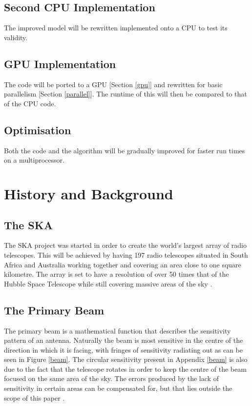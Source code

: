 \subsection{Second CPU Implementation}
The improved model will be rewritten implemented onto a CPU to test its validity.
\subsection{GPU Implementation}
The code will be ported to a GPU [Section \ref{gpu}] and rewritten for basic parallelism [Section \ref{parallel}]. The runtime of this will then be compared to that of the CPU code.
\subsection{Optimisation}
Both the code and the algorithm will be gradually improved for faster run times on a multiprocessor.
\newpage
\section{History and Background}
\subsection{The SKA}\label{ska}
The SKA project was started in order to create the world's largest array of radio telescopes. This will be achieved by having 197 radio telescopes situated in South Africa and Australia working together and covering an area close to one square kilometre. The array is set to have a resolution of over 50 times that of the Hubble Space Telescope while still covering massive areas of the sky \cite{SKAsite}.
\subsection{The Primary Beam}\label{tpb}
The primary beam is a mathematical function that describes the sensitivity pattern of an antenna. Naturally the beam is most sensitive in the centre of the direction in which it is facing, with fringes of sensitivity radiating out as can be seen in Figure \ref{beam}. The circular sensitivity present in Appendix \ref{beam} is also due to the fact that the telescope rotates in order to keep the centre of the beam focused on the same area of the sky. The errors produced by the lack of sensitivity in certain areas can be compensated for, but that lies outside the scope of this paper \cite{oleg}.
